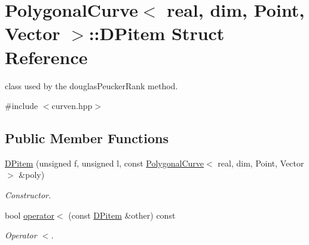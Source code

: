 \hypertarget{structPolygonalCurve_1_1DPitem}{
\section{PolygonalCurve$<$ real, dim, Point, Vector $>$::DPitem Struct Reference}
\label{structPolygonalCurve_1_1DPitem}
}


class used by the douglasPeuckerRank method.  




{\ttfamily \#include $<$curven.hpp$>$}

\subsection*{Public Member Functions}
\begin{DoxyCompactItemize}
\item 
\hyperlink{structPolygonalCurve_1_1DPitem_a7bc8e2684372da099f75ed38e064d948}{DPitem} (unsigned f, unsigned l, const \hyperlink{classPolygonalCurve}{PolygonalCurve}$<$ real, dim, Point, Vector $>$ \&poly)
\begin{DoxyCompactList}\small\item\em Constructor. \end{DoxyCompactList}\item 
\hypertarget{structPolygonalCurve_1_1DPitem_a55d33e0b8ae80e9ac78d7f2861e64b20}{
bool \hyperlink{structPolygonalCurve_1_1DPitem_a55d33e0b8ae80e9ac78d7f2861e64b20}{operator$<$} (const \hyperlink{structPolygonalCurve_1_1DPitem}{DPitem} \&other) const }
\label{structPolygonalCurve_1_1DPitem_a55d33e0b8ae80e9ac78d7f2861e64b20}

\begin{DoxyCompactList}\small\item\em Operator $<$. \end{DoxyCompactList}\end{DoxyCompactItemize}
